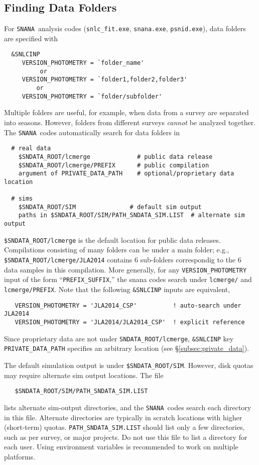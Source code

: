 \documentclass[12pt]{article}
\newcommand{\snana}{{\tt SNANA}}
\begin{document}
   \subsection{Finding Data Folders }
   \label{subsec:data_folders}

For \snana\ analysis codes 
({\tt snlc\_fit.exe}, {\tt snana.exe}, {\tt psnid.exe}),
data folders are specified with 
\begin{verbatim}
  &SNLCINP
     VERSION_PHOTOMETRY = `folder_name'
          or
     VERSION_PHOTOMETRY = `folder1,folder2,folder3'
         or 
     VERSION_PHOTOMETRY = `folder/subfolder'
\end{verbatim}
%
Multiple folders are useful, for example, when data from a
survey are separated into seasons. However, folders from 
different surveys {\it cannot} be analyzed together.
The \snana\ codes automatically search for data folders in
%
\begin{verbatim}                                                               
  # real data
    $SNDATA_ROOT/lcmerge             # public data release
    $SNDATA_ROOT/lcmerge/PREFIX      # public compilation
    argument of PRIVATE_DATA_PATH    # optional/proprietary data location

  # sims
    $SNDATA_ROOT/SIM               # default sim output
    paths in $SNDATA_ROOT/SIM/PATH_SNDATA_SIM.LIST  # alternate sim output
\end{verbatim}
%
{\tt \$SNDATA\_ROOT/lcmerge} is the default location for public data releases.
Compilations consisting of many folders can be under a main folder;
e.g., {\tt \$SNDATA\_ROOT/lcmerge/JLA2014} contains 6 sub-folders
correspondig to the 6 data samples in this compilation. More generally,
for any {\tt VERSION\_PHOTOMETRY} input of the form ``{\tt PREFIX\_SUFFIX},''
the snana codes search under {\tt lcmerge/} and {\tt lcmerge/PREFIX}.
Note that the following {\tt \&SNLCINP} inputs are equivalent,
\begin{verbatim}
   VERSION_PHOTOMETRY = 'JLA2014_CSP'          ! auto-search under JLA2014
   VERSION_PHOTOMETRY = 'JLA2014/JLA2014_CSP'  ! explicit reference
\end{verbatim}
%
Since proprietary data are not under {\tt SNDATA\_ROOT/lcmerge},
{\tt \&SNLCINP} key {\tt PRIVATE\_DATA\_PATH} specifies an arbitrary
location (see \S\ref{subsec:private_data}). 

The default simulation output is under {\tt \$SNDATA\_ROOT/SIM}.
However, disk quotas may require alternate sim output locations.
The file 
\begin{verbatim} 
   $SNDATA_ROOT/SIM/PATH_SNDATA_SIM.LIST
\end{verbatim}
lists alternate sim-output directories, and the \snana\ codes search
each directory in this file.
Alternate directories are typically in scratch locations
with higher (short-term) quotas. {\tt PATH\_SNDATA\_SIM.LIST}
should list only a few directories, such as per survey, or major projects.
Do not use this file to list a directory for each user.
Using environment variables is recommended to work on multiple
platforms.
\end{document}
